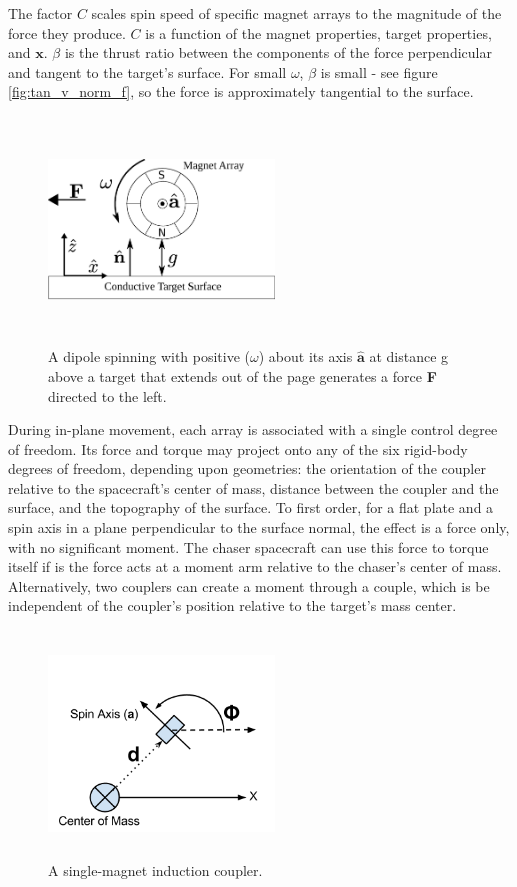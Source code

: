 The factor $C$ scales spin speed of specific magnet arrays to the magnitude of the force they produce. $C$ is a function of the magnet properties, target properties, and $\boldsymbol{x}$. $\beta$ is the thrust ratio between the components of the force perpendicular and tangent to the target's surface. For small $\omega$, $\beta$ is small - see figure \ref{fig:tan_v_norm_f}, so the force is approximately tangential to the surface.

\begin{figure}
\includegraphics[width = 6cm, height = 6cm ]{figures/spin_mag_diagram.eps}

\caption{A dipole spinning with positive ($\omega$) about its axis $\hat{\textbf{a}}$ at distance g above a target that extends out of the page generates a force \textbf{F} directed to the left.}
\label{fig:arry_force_diagram}
\end{figure}

During in-plane movement, each array is associated with a single control degree of freedom. Its force and torque may project onto any of the six rigid-body degrees of freedom, depending upon geometries: the orientation of the coupler relative to the spacecraft's center of mass, distance between the coupler and the surface, and the topography of the surface. To first order, for a flat plate and a spin axis in a plane perpendicular to the surface normal, the effect is a force only, with no significant moment. The chaser spacecraft can use this force to torque itself if is the force acts at a moment arm relative to the chaser's center of mass. Alternatively, two couplers can create a moment through a couple, which is be independent of the coupler's position relative to the target's mass center.

\begin{figure}
\includegraphics[width = 6cm, height = 6cm ]{figures/minimum_array.png}

\caption{A single-magnet induction coupler.}
\label{fig:min_array_diagram}
\end{figure}

